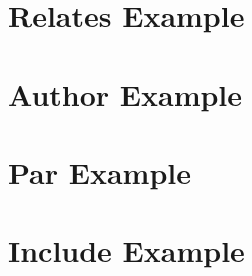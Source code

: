 \documentclass{book}
\newcommand{\+}{\discretionary{\mbox{\scriptsize$\hookleftarrow$}}{}{}}
\begin{document}
\chapter{Relates Example}\label{relates_example}\hypertarget{relates_example}{}
\chapter{Author Example}\label{author_example}\hypertarget{author_example}{}
\chapter{Par Example}\label{par_example}\hypertarget{par_example}{}
\chapter{Include Example}\label{include_example}\hypertarget{include_example}{}


\printindex
\end{document}

